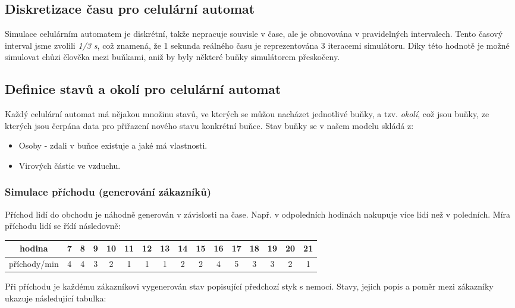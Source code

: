 \documentclass[11pt,a4paper]{article}
\begin{document}
\subsection{Diskretizace času pro celulární automat}
Simulace celulárním automatem je diskrétní, takže nepracuje souvisle v čase, ale je obnovována v pravidelných intervalech. Tento časový interval jsme zvolili \emph{1/3 s}, což znamená, že 1 sekunda reálného času je reprezentována 3 iteracemi simulátoru. Díky této hodnotě je možné simulovat chůzi člověka mezi buňkami, aniž by byly některé buňky simulátorem přeskočeny. 

\subsection{Definice stavů a okolí pro celulární automat}
Každý celulární automat má nějakou množinu stavů, ve kterých se můžou nacházet jednotlivé buňky, a tzv. \emph{okolí}, což jsou buňky, ze kterých jsou čerpána data pro přiřazení nového stavu konkrétní buňce. Stav buňky se v našem modelu skládá z:
\begin{itemize}
    \item Osoby - zdali v buňce existuje a jaké má vlastnosti.
    \item Virových částic ve vzduchu.
\end{itemize}

\subsubsection{Simulace příchodu (generování zákazníků)}
Příchod lidí do obchodu je náhodně generován v závislosti na čase. Např. v odpoledních hodinách nakupuje více lidí než v poledních. Míra příchodu lidí se řídí následovně:

\begin{center}
    \begin{tabular}{ |c|c|c|c|c|c|c|c|c|c|c|c|c|c|c|c| } 
    \hline
        hodina & 7 & 8 & 9 & 10 & 11 & 12 & 13 & 14 & 15 & 16 & 17 & 18 & 19 & 20 & 21 \\  \hline
        příchody/min & 4 & 4 & 3 & 2 & 1 & 1 & 1 & 2 & 2 & 4 & 5 & 3 & 3 & 2 & 1  \\ 
    \hline
    \end{tabular}
\end{center}

Při příchodu je každému zákazníkovi vygenerován stav popisující předchozí styk s nemocí. Stavy, jejich popis a poměr mezi zákazníky ukazuje následující tabulka:
\end{document}
